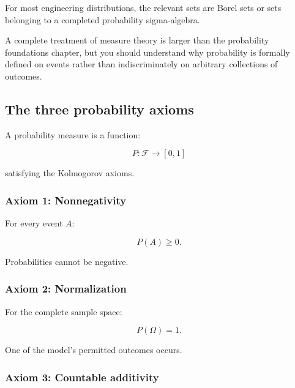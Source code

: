 For most engineering distributions, the relevant sets are Borel sets or sets belonging to a completed probability sigma-algebra.

A complete treatment of measure theory is larger than the probability foundations chapter, but you should understand why probability is formally defined on events rather than indiscriminately on arbitrary collections of outcomes.

\subsection{The three probability axioms}\label{02-foundations-ii-ch023-the-three-probability-axioms}

\hypertarget{02-foundations-ii-ch023-the-three-probability-axioms}{}

A probability measure is a function:

\[
 P:\mathcal F\rightarrow[0,1]
\]

satisfying the Kolmogorov axioms.

\subsubsection{Axiom 1: Nonnegativity}\label{02-foundations-ii-ch023-axiom-1-nonnegativity}

\hypertarget{02-foundations-ii-ch023-axiom-1-nonnegativity}{}

For every event \(A\):

\[
 \boxed{P(A)\ge0}.
\]

Probabilities cannot be negative.

\subsubsection{Axiom 2: Normalization}\label{02-foundations-ii-ch023-axiom-2-normalization}

\hypertarget{02-foundations-ii-ch023-axiom-2-normalization}{}

For the complete sample space:

\[
 \boxed{P(\Omega)=1}.
\]

One of the model's permitted outcomes occurs.

\subsubsection{Axiom 3: Countable additivity}\label{02-foundations-ii-ch023-axiom-3-countable-additivity}


